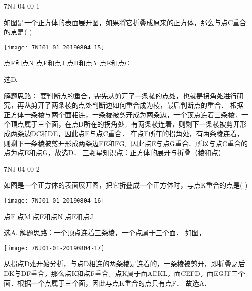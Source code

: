 
\begin{defproblem}{7NJ-04-00-1}%
\begin{onlyproblem}%
如图是一个正方体的表面展开图，如果将它折叠成原来的正方体，那么与点C重合的点是(    )
\begin{center}
\texttt{[image: 7NJ01-01-20190804-15]}
\end{center}
\xx
{点E和点N}
{点E和点J}
{点H和点A}
{点E和点G}

\end{onlyproblem}%
\begin{onlysolution}%
\begin{solution}%
选D.

解题思路： 要判断点的重合，需先从剪开了一条棱的点处，也就是拐角处进行研究，再从剪开了两条棱的点处判断边如何重合成为棱，最后判断点的重合． 根据正方体一条棱与两个面相连，一条棱被剪开成为两条边，一个顶点连着三条棱，一个顶点属于三个面，在点D所在的拐角处，有两条棱连着，则剩下一条棱被剪开形成两条边DC和DE，因此点E与点C重合． 在点F所在的拐角处，有两条棱连着，则剩下一条棱被剪开形成两条边FE和FG，因此点E与点G重合．所以与点C重合的点为点E和点G，故选D． 
三颗星知识点：正方体的展开与折叠（棱和点）  
\end{solution}%
\end{onlysolution}%
\end{defproblem}


\begin{defproblem}{7NJ-04-00-2}%
\begin{onlyproblem}%
如图是一个正方体的表面展开图，把它折叠成一个正方体时，与点K重合的点是(    ) 
\begin{center}
\texttt{[image: 7NJ01-01-20190804-16]}
\end{center}

\xx
{点F}
{点M}
{点F和点N}
{点F和点J}

\end{onlyproblem}%
\begin{onlysolution}%
\begin{solution}%
选A.
解题思路：一个顶点连着三条棱，一个点属于三个面． 如图，
\begin{center}
\texttt{[image: 7NJ01-01-20190804-17]}
\end{center}
从拐点D处开始分析，与点D相连的两条棱是连着的，一条棱被剪开，即折叠之后DK与DF重合，那么点K和点F重合，点K属于面ADKL，面CEFD，面EGJF三个面．根据一个点属于三个面，因此与点K重合的点只有点F． 故选A． 
\end{solution}%
\end{onlysolution}%
\end{defproblem}


